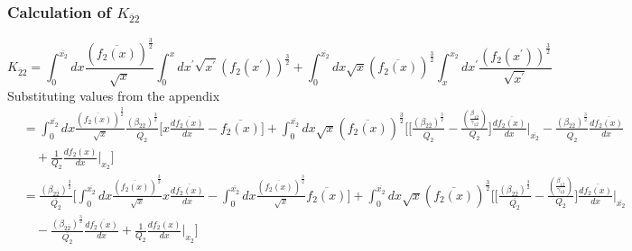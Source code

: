 \documentclass[fleqn, 10pt]{article}
\begin{document}
            \subsubsection{Calculation of $K_{\overline{2}2}$}
            \begin{equation}
                    K_{\overline{2}2} = \int^{\overline{x_2}}_0 dx \frac{(\overline{f_2(x)})^\frac{3}{2}}{\sqrt{x}} \int^{x}_0 dx^{'} \sqrt{x^{'}} (f_2(x^{'}))^\frac{3}{2} + \int^{\overline{x_2}}_0dx \sqrt{x} (\overline{f_2(x)})^\frac{3}{2} \int^{x_2}_{x}dx^{'} \frac{(f_2(x^{'}))^\frac{3}{2}}{\sqrt{x^{'}}}
                    \label{42}
            \end{equation}
            Substituting values from the appendix 
            \begin{equation*}
            \begin{split}
             & =  \int^{\overline{x_2}}_0 dx \frac{(\overline{f_2(x)})^\frac{3}{2}}{\sqrt{x}} \frac{(\beta_{2\overline{2}})^\frac{3}{2}}{\overline{Q_2}}\biggl[x\frac{d\overline{f_2(x)}}{dx}-\overline{f_2(x)}\biggr] + \int^{\overline{x_2}}_0 dx \sqrt{x} (\overline{f_2(x)})^\frac{3}{2}\Biggl[\biggl[\frac{(\beta_{2\overline{2}})^\frac{3}{2}}{\overline{Q_2}}-  \frac{\left(\frac{\beta_{1\overline{2}}}{\gamma_{12}}\right)}{Q_2}\biggr]\frac{d\overline{f_2(x)}}{dx}\Bigg|_{\overline{x_2}} - \frac{(\beta_{2\overline{2}})^\frac{3}{2}}{\overline{Q_2}} \frac{d\overline{f_2(x)}}{dx} \\ & \quad +   \frac{1}{Q_2} \frac{df_2(x)}{dx}\Bigg|_{x_2}\Biggr]
             \end{split}
            \end{equation*}
            \begin{equation*}
            \begin{split}
               & = \frac{(\beta_{2\overline{2}})^\frac{3}{2}}{\overline{Q_2}}\biggl[\int^{\overline{x_2}}_0 dx \frac{(\overline{f_2(x)})^\frac{3}{2}}{\sqrt{x}} x \frac{d\overline{f_2(x)}}{dx} - \int^{\overline{x_2}}_0 dx \frac{(\overline{f_2(x)})^\frac{3}{2}}{\sqrt{x}}\overline{f_2(x)} \biggr]+ \int^{\overline{x_2}}_0 dx \sqrt{x} (\overline{f_2(x)})^\frac{3}{2} \biggl[\biggl[\frac{(\beta_{2\overline{2}})^\frac{3}{2}}{\overline{Q_2}}  -   \frac{\left(\frac{\beta_{1\overline{2}}}{\gamma_{12}}\right)}{Q_2}\biggr]\frac{d\overline{f_2(x)}}{dx}\Bigg|_{\overline{x_2}} \\ & \quad - \frac{(\beta_{2\overline{2}})^\frac{3}{2}}{\overline{Q_2}}\frac{d\overline{f_2(x)}}{dx}+ \frac{1}{Q_2} \frac{df_2(x)}{dx}\Bigg|_{x_2}\biggr]
               \end{split}
            \end{equation*}
\end{document}
